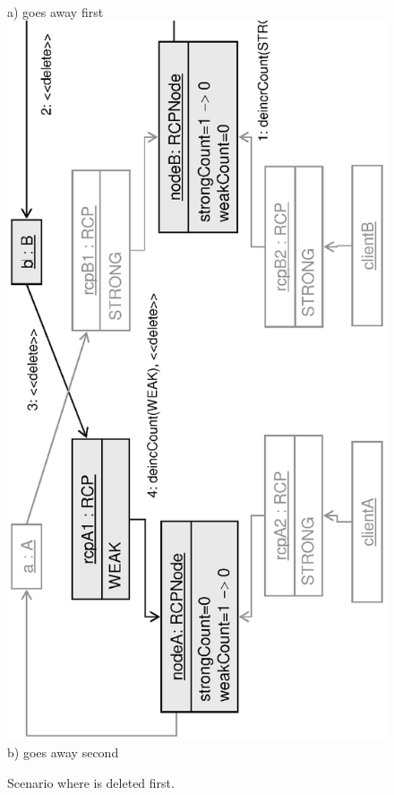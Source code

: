 \documentclass[pdf,ps2pdf,11pt]{SANDreport}
\begin{document}
{\begin{figure}
\begin{center}
\\[2ex] a) {} goes away first \\[3ex]
\includegraphics*[angle=270,scale=0.65]{CircularRCP_A_B_ClientA_2}
\\[2ex] b) {} goes away second \\[3ex]
\end{center}
\caption{
\label{fig:CircularRCP_A_B_ClientA}
Scenario where {} is deleted first.  }
\end{figure}
\esinglespace}
\end{document}
